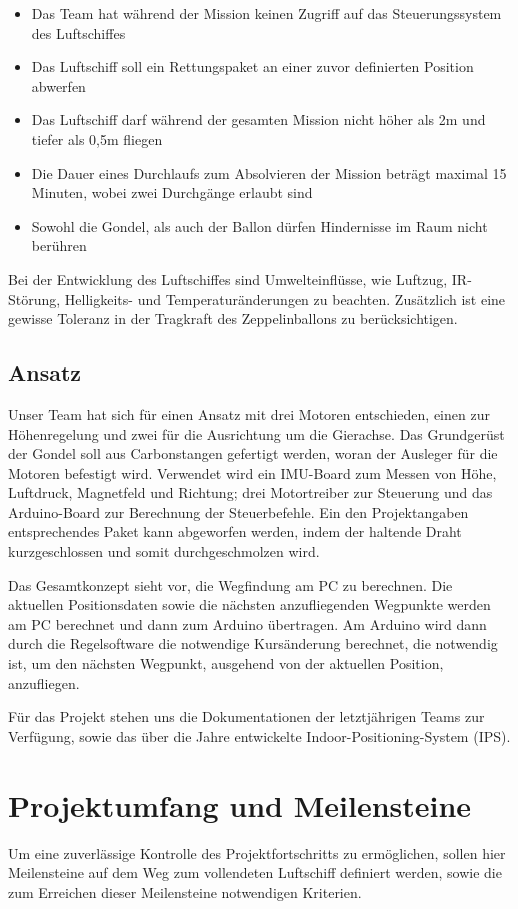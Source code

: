 \documentclass[lang=ngerman,inputenc=utf8,fontsize=10pt]{ldvarticle}
\begin{document}
\begin{itemize}
\item Das Team hat während der Mission keinen Zugriff auf das Steuerungssystem des Luftschiffes 
\item Das Luftschiff soll ein Rettungspaket an einer zuvor definierten Position abwerfen
\item Das Luftschiff darf während der gesamten Mission nicht höher als 2m und tiefer als 0,5m fliegen
\item Die Dauer eines Durchlaufs zum Absolvieren der Mission beträgt maximal 15 Minuten, wobei zwei Durchgänge erlaubt sind
\item Sowohl die Gondel, als auch der Ballon dürfen Hindernisse im Raum nicht berühren
\end{itemize}

Bei der Entwicklung des Luftschiffes sind Umwelteinflüsse, wie Luftzug, IR-Störung, Helligkeits- und Temperaturänderungen zu beachten. Zusätzlich ist eine gewisse Toleranz in der Tragkraft des Zeppelinballons zu berücksichtigen.

\subsection*{Ansatz}
Unser Team hat sich für einen Ansatz mit drei Motoren entschieden, einen zur Höhenregelung und zwei für die Ausrichtung um die Gierachse. Das Grundgerüst der Gondel soll aus Carbonstangen gefertigt werden, woran der Ausleger für die Motoren befestigt wird. Verwendet wird ein IMU-Board zum Messen von Höhe, Luftdruck, Magnetfeld und Richtung; drei Motortreiber zur Steuerung und das Arduino-Board zur Berechnung der Steuerbefehle. Ein den Projektangaben entsprechendes Paket kann abgeworfen werden,  indem der haltende Draht kurzgeschlossen und somit durchgeschmolzen wird.


Das Gesamtkonzept sieht vor, die Wegfindung am PC zu berechnen. Die aktuellen Positionsdaten sowie die nächsten anzufliegenden Wegpunkte werden am PC berechnet und dann zum Arduino übertragen. Am Arduino wird dann durch die Regelsoftware die notwendige Kursänderung berechnet, die notwendig ist, um den nächsten Wegpunkt, ausgehend von der aktuellen Position, anzufliegen.


Für das Projekt stehen uns die Dokumentationen der letztjährigen Teams zur Verfügung, sowie das über die Jahre entwickelte Indoor-Positioning-System (IPS).


\newpage
\section{Projektumfang und Meilensteine}
Um eine zuverlässige Kontrolle des Projektfortschritts zu ermöglichen, sollen hier Meilensteine auf dem Weg zum vollendeten Luftschiff definiert werden, sowie die zum Erreichen dieser Meilensteine notwendigen Kriterien.
\end{document}
